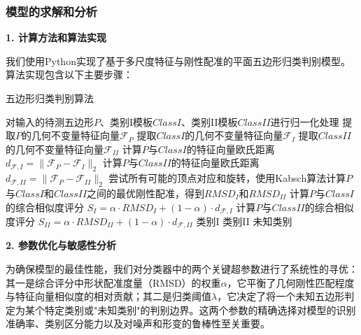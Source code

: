 \subsubsection{模型的求解和分析}
    \textbf{1. 计算方法和算法实现}
    
  我们使用Python实现了基于多尺度特征与刚性配准的平面五边形归类判别模型。算法实现包含以下主要步骤：

\begin{algorithm}[H] %
\caption{五边形归类判别算法}
\label{alg:polygon_classification}
\begin{algorithmic}[1] %
        \State 对输入的待测五边形$P$、类别I模板$\mathit{ClassI}$、类别II模板$\mathit{ClassII}$进行归一化处理
        \State 提取$P$的几何不变量特征向量$\mathcal{F}_P$
        \State 提取$\mathit{ClassI}$的几何不变量特征向量$\mathcal{F}_I$
        \State 提取$\mathit{ClassII}$的几何不变量特征向量$\mathcal{F}_{II}$
        \State 计算$P$与$\mathit{ClassI}$的特征向量欧氏距离 $d_{\mathcal{F},I} = \|\mathcal{F}_P - \mathcal{F}_I\|_2$
        \State 计算$P$与$\mathit{ClassII}$的特征向量欧氏距离 $d_{\mathcal{F},II} = \|\mathcal{F}_P - \mathcal{F}_{II}\|_2$
        \State 尝试所有可能的顶点对应和旋转，使用Kabsch算法计算$P$与$\mathit{ClassI}$和$\mathit{ClassII}$之间的最优刚性配准，得到$\mathit{RMSD}_{I}$和$\mathit{RMSD}_{II}$
        \State 计算$P$与$\mathit{ClassI}$的综合相似度评分 $S_I = \alpha \cdot \mathit{RMSD}_I + (1-\alpha) \cdot d_{\mathcal{F},I}$ 
        \State 计算$P$与$\mathit{ClassII}$的综合相似度评分 $S_{II} = \alpha \cdot \mathit{RMSD}_{II} + (1-\alpha) \cdot d_{\mathcal{F},II}$
         
            \State \Return 类别I
            \State \Return 类别II
        \Else
            \State \Return 未知类别
        \EndIf
    \EndFunction
\end{algorithmic}
\end{algorithm}

\textbf{2. 参数优化与敏感性分析}\

为确保模型的最佳性能，我们对分类器中的两个关键超参数进行了系统性的寻优：其一是综合评分中形状配准度量（RMSD）的权重$\alpha$，它平衡了几何刚性匹配程度与特征向量相似度的相对贡献；其二是归类阈值$\lambda$，它决定了将一个未知五边形判定为某个特定类别或"未知类别"的判别边界。这两个参数的精确选择对模型的识别准确率、类别区分能力以及对噪声和形变的鲁棒性至关重要。

